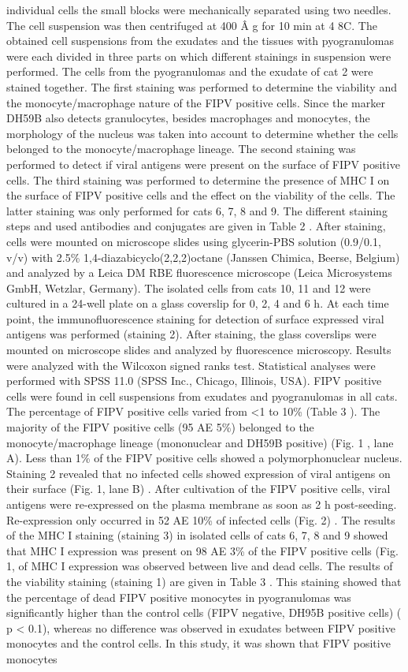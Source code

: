 \documentclass[11pt]{article}
\begin{document}
\begin{description}
individual cells the small blocks were mechanically separated using two needles. The cell suspension was then centrifuged at 400 Â g for 10 min at 4 8C. The obtained cell suspensions from the exudates and the tissues with pyogranulomas were each divided in three parts on which different stainings in suspension were performed. The cells from the pyogranulomas and the exudate of cat 2 were stained together. The first staining was performed to determine the viability and the monocyte/macrophage nature of the FIPV positive cells. Since the marker DH59B also detects granulocytes, besides macrophages and monocytes, the morphology of the nucleus was taken into account to determine whether the cells belonged to the monocyte/macrophage lineage. The second staining was performed to detect if viral antigens were present on the surface of FIPV positive cells. The third staining was performed to determine the presence of MHC I on the surface of FIPV positive cells and the effect on the viability of the cells. The latter staining was only performed for cats 6, 7, 8 and 9. The different staining steps and used antibodies and conjugates are given in Table 2 . After staining, cells were mounted on microscope slides using glycerin-PBS solution (0.9/0.1, v/v) with 2.5\% 1,4-diazabicyclo(2,2,2)octane (Janssen Chimica, Beerse, Belgium) and analyzed by a Leica DM RBE fluorescence microscope (Leica Microsystems GmbH, Wetzlar, Germany). The isolated cells from cats 10, 11 and 12 were cultured in a 24-well plate on a glass coverslip for 0, 2, 4 and 6 h. At each time point, the immunofluorescence staining for detection of surface expressed viral antigens was performed (staining 2). After staining, the glass coverslips were mounted on microscope slides and analyzed by fluorescence microscopy. Results were analyzed with the Wilcoxon signed ranks test. Statistical analyses were performed with SPSS 11.0 (SPSS Inc., Chicago, Illinois, USA). FIPV positive cells were found in cell suspensions from exudates and pyogranulomas in all cats. The percentage of FIPV positive cells varied from <1 to 10\% (Table 3 ). The majority of the FIPV positive cells (95 AE 5\%) belonged to the monocyte/macrophage lineage (mononuclear and DH59B positive) (Fig. 1 , lane A). Less than 1\% of the FIPV positive cells showed a polymorphonuclear nucleus. Staining 2 revealed that no infected cells showed expression of viral antigens on their surface (Fig. 1,  lane B) . After cultivation of the FIPV positive cells, viral antigens were re-expressed on the plasma membrane as soon as 2 h post-seeding. Re-expression only occurred in 52 AE 10\% of infected cells (Fig. 2) . The results of the MHC I staining (staining 3) in isolated cells of cats 6, 7, 8 and 9 showed that MHC I expression was present on 98 AE 3\% of the FIPV positive cells (Fig. 1, of MHC I expression was observed between live and dead cells. The results of the viability staining (staining 1) are given in Table 3 . This staining showed that the percentage of dead FIPV positive monocytes in pyogranulomas was significantly higher than the control cells (FIPV negative, DH95B positive cells) ( p < 0.1), whereas no difference was observed in exudates between FIPV positive monocytes and the control cells. In this study, it was shown that FIPV positive monocytes 
\end{description}
\end{document}
